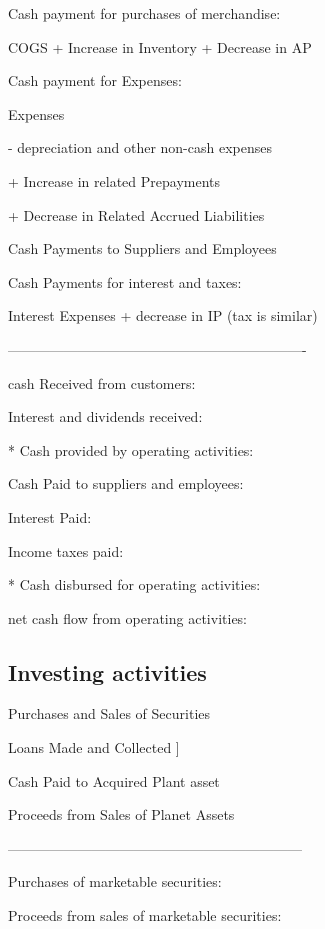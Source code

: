 \documentclass[10pt, a4paper]{article}
\begin{document}
    Cash payment for purchases of merchandise:
    \begin{center}
        COGS + Increase in Inventory + Decrease in AP
    \end{center}

    Cash payment for Expenses:
    \begin{center}
        Expenses 
        
        - depreciation and other non-cash expenses

        + Increase in related Prepayments 

        + Decrease in Related Accrued Liabilities
    \end{center}

    Cash Payments to Suppliers and Employees

    Cash Payments for interest and taxes:
    \begin{center}
        Interest Expenses + decrease in IP (tax is similar)
    \end{center}

    ----------------------------------------------------------------

    cash Received from customers:

    Interest and dividends received: 

    * Cash provided by operating activities: 

    Cash Paid to suppliers and employees:

    Interest Paid: 

    Income taxes paid:

    * Cash disbursed for operating activities: 

    net cash flow from operating activities: 


\subsection*{Investing activities}

    Purchases and Sales of Securities 

    Loans Made and Collected ]
    
    Cash Paid to Acquired Plant asset

    Proceeds from Sales of Planet Assets

    ---------------------------------------------------------------

    Purchases of marketable securities:

    Proceeds from sales of marketable securities: 
\end{document}
